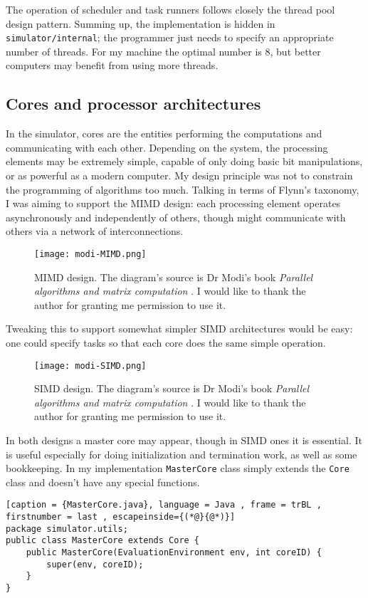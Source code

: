 \documentclass[12pt,a4paper,twoside,openright]{report}
\begin{document}
The operation of scheduler and task runners follows closely the thread pool design pattern. Summing up, the implementation is hidden in \texttt{simulator/internal}; the programmer just needs to specify an appropriate number of threads. For my machine the optimal number is $8$, but better computers may benefit from using more threads. 

\subsection{Cores and processor architectures}
In the simulator, cores are the entities performing the computations and communicating with each other. Depending on the system, the processing elements may be extremely simple, capable of only doing basic bit manipulations, or as powerful as a modern computer. My design principle was not to constrain the programming of algorithms too much. Talking in terms of Flynn's taxonomy\cite{Flynn}, I was aiming to support the MIMD design: each processing element operates asynchronously and independently of others, though might communicate with others via a network of interconnections. 

\begin{figure}
  \caption{MIMD design. The diagram's source is Dr Modi's book \textit{Parallel algorithms and matrix computation} \cite{modibook}. I would like to thank the author for granting me permission to use it.}
  \texttt{[image: modi-MIMD.png]}
\end{figure}

Tweaking this to support somewhat simpler SIMD architectures would be easy: one could specify tasks so that each core does the same simple operation. 

\begin{figure}[h]
  \caption{SIMD design. The diagram's source is Dr Modi's book \textit{Parallel algorithms and matrix computation} \cite{modibook}. I would like to thank the author for granting me permission to use it.}
  \texttt{[image: modi-SIMD.png]}
\end{figure}

In both designs a master core may appear, though in SIMD ones it is essential. It is useful especially for doing initialization and termination work, as well as some bookkeeping. In my implementation \texttt{MasterCore} class simply extends the \texttt{Core} class and doesn't have any special functions.

\begin{lstlisting}[caption = {MasterCore.java}, language = Java , frame = trBL , firstnumber = last , escapeinside={(*@}{@*)}]
package simulator.utils;
public class MasterCore extends Core {
    public MasterCore(EvaluationEnvironment env, int coreID) {
        super(env, coreID);
    }
}
\end{lstlisting}
\end{document}
